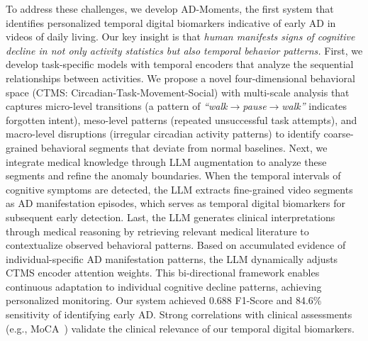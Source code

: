 \documentclass[sigconf, anonymous, 9pt, nonacm]{acmart}
\newcommand{\sys}{AD-Moments\xspace}
\begin{document}
To address these challenges, we develop \sys, the first system that identifies personalized temporal digital biomarkers indicative of early AD in videos of daily living.
Our key insight is that \emph{human manifests signs of cognitive decline in not only activity statistics but also temporal behavior patterns.}
First, we develop task-specific models with temporal encoders that analyze the sequential relationships between activities. 
We propose a novel four-dimensional behavioral space (CTMS: Circadian-Task-Movement-Social) with multi-scale analysis that captures micro-level transitions (a pattern of \emph{``walk$\rightarrow$pause$\rightarrow$walk''} indicates forgotten intent), meso-level patterns (repeated unsuccessful task attempts), and macro-level disruptions (irregular circadian activity patterns) to identify coarse-grained behavioral segments that deviate from normal baselines.
Next, we integrate medical knowledge through LLM augmentation to analyze these segments and refine the anomaly boundaries. 
When the temporal intervals of cognitive symptoms are detected, the LLM extracts fine-grained video segments as AD manifestation episodes, which serves as temporal digital biomarkers for subsequent early detection.
Last, the LLM generates clinical interpretations through medical reasoning by retrieving relevant medical literature to contextualize observed behavioral patterns.
Based on accumulated evidence of individual-specific AD manifestation patterns, the LLM dynamically adjusts CTMS encoder attention weights. 
This bi-directional framework enables continuous adaptation to individual cognitive decline patterns, achieving personalized monitoring.
Our system achieved 0.688 F1-Score and 84.6\% sensitivity of identifying early AD. Strong correlations with clinical assessments (e.g., MoCA~\cite{Nasreddine2005MoCA}) validate the clinical relevance of our temporal digital biomarkers.
\end{document}
